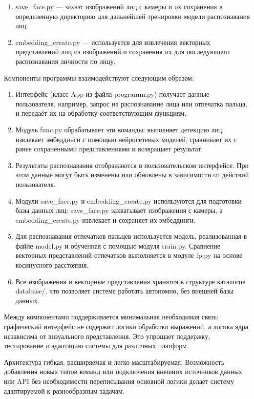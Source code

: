 \begin{enumerate}
	\item save\_face.py — захват изображений лиц с камеры и их сохранения в определенную директорию для дальнейшей тренировки модели распознавания лиц.
	
	\item embedding\_create.py — используется для извлечения векторных представлений лиц из изображений и сохранения их для последующего распознавания личности по лицу.
	
\end{enumerate}

Компоненты программы взаимодействуют следующим образом:
\begin{enumerate}
	\item Интерфейс (класс App из файла programm.py) получает данные пользователя, например, запрос на распознавание лица или отпечатка пальца, и передаёт их на обработку соответствующим функциям.
	
	\item Модуль func.py обрабатывает эти команды: выполняет детекцию лиц, извлекает эмбеддинги с помощью нейросетевых моделей, сравнивает их с ранее сохранёнными представлениями и возвращает результат.
	
	\item Результаты распознавания отображаются в пользовательском интерфейсе. При этом данные могут быть изменены или обновлены в зависимости от действий пользователя.
	
	\item Модули save\_face.py и embedding\_create.py используются для подготовки базы данных лиц: save\_face.py захватывает изображения с камеры, а embedding\_create.py извлекает и сохраняет их эмбеддинги.
	
	\item Для распознавания отпечатков пальцев используется модель, реализованная в файле model.py и обученная с помощью модуля train.py. Сравнение векторных представлений отпечатков выполняется в модуле fp.py на основе косинусного расстояния.
	
	\item Все изображения и векторные представления хранятся в структуре каталогов database/, что позволяет системе работать автономно, без внешней базы данных.
\end{enumerate}

Между компонентами поддерживается минимальная необходимая связь: графический интерфейс не содержит логики обработки выражений, а логика ядра независима от визуального представления. Это упрощает поддержку, тестирование и адаптацию системы для различных платформ.

Архитектура гибкая, расширяемая и легко масштабируемая. Возможность добавления новых типов команд или подключения внешних источников данных или API без необходимости переписывания основной логики делает систему адаптируемой к разнообразным задачам.
